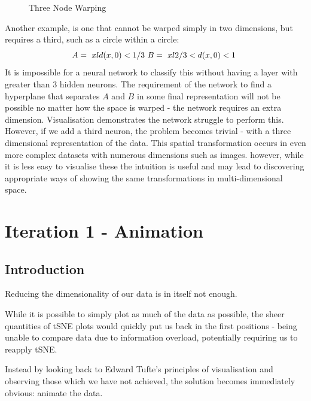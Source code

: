 \documentclass[a4paper,11pt,titlepage]{article}
\begin{document}
 		 \begin{figure}[H]
    			\caption{Three Node Warping}%
    			\label{fig:studentprofile}
		\end{figure}
		
 		
		Another example, is one that cannot be warped simply in two dimensions, but requires a third, such as a circle within a circle:
		$$ 
		A = \text{ $ { xld(x,0) < 1/3 } $ }		
		B = \text{ $ { xl2/3 < d(x,0) < 1 } $ }
		$$ 
		It is impossible for a neural network to classify this without having a layer with greater than 3 hidden neurons. The requirement of the network to find a hyperplane that separates $ A $ and $ B $ in some final representation will not be possible no matter how the space is warped - the network requires an extra dimension. Visualisation demonstrates the network struggle to perform this. However, if we add a third  neuron, the problem becomes trivial - with a three dimensional representation of the data. This spatial transformation occurs in even more complex datasets with numerous dimensions \cite{Carlsson2008} such as images. however, while it is less easy to visualise these the intuition is useful and may lead to discovering appropriate ways of showing the same transformations in multi-dimensional space.
\clearpage

\section{Iteration 1 - Animation}
	\subsection{Introduction}
	Reducing the dimensionality of our data is in itself not enough. 
	\par 
	While it is possible to simply plot as much of the data as possible, the sheer quantities of tSNE plots would quickly put us back in the first positions - being unable to compare data due to information overload, potentially requiring us to reapply tSNE. 
	\par 
	Instead by looking back to Edward Tufte's principles of visualisation and observing those which we have not achieved, the solution becomes immediately obvious: animate the data.
	\par 
	
\end{document}
